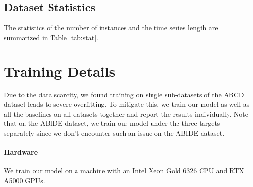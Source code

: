 \subsection{Dataset Statistics}
The statistics of the number of instances and the time series length are summarized in Table \ref{tab:stat}.
\begin{table}
    \centering
     \caption{Statistics of datasets we use. ABIDE dataset only contains resting-state fMRI data. ABCD contains resting-state and task-based data. We use ABCD of $2$ timepoints. For example, \textit{Rest 1} means resting-state fMRI data from timepoint $1$.}
    \label{tab:stat}
\end{table}


\section{Training Details}
\label{app:training}
Due to the data scarcity, we found training on single sub-datasets of the ABCD dataset leads to severe overfitting. To mitigate this, we train our model as well as all the baselines on all datasets together and report the results individually. Note that on the ABIDE dataset, we train our model under the three targets separately since we don't encounter such an issue on the ABIDE dataset.

\paragraph{Hardware}
We train our model on a machine with an Intel Xeon Gold 6326 CPU and RTX A5000 GPUs.

